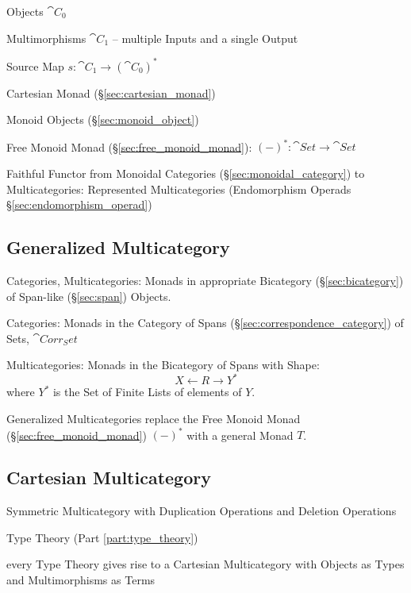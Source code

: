 Objects $\cat{C}_0$

Multimorphisms $\cat{C}_1$ -- multiple Inputs and a single Output

Source Map $s : \cat{C}_1 \rightarrow (\cat{C}_0)^*$

Cartesian Monad (\S\ref{sec:cartesian_monad})

Monoid Objects (\S\ref{sec:monoid_object})

Free Monoid Monad (\S\ref{sec:free_monoid_monad}): $(-)^* : \cat{Set}
\rightarrow \cat{Set}$

Faithful Functor from Monoidal Categories
(\S\ref{sec:monoidal_category}) to Multicategories: Represented
Multicategories (Endomorphism Operads \S\ref{sec:endomorphism_operad})



\subsection{Generalized Multicategory}
\label{sec:generalized_multicategory}

Categories, Multicategories: Monads in appropriate Bicategory
(\S\ref{sec:bicategory}) of Span-like (\S\ref{sec:span}) Objects.

Categories: Monads in the Category of Spans
(\S\ref{sec:correspondence_category}) of Sets, $\cat{Corr_Set}$

Multicategories: Monads in the Bicategory of Spans with Shape:
\[
  X \leftarrow R \rightarrow Y^*
\]
where $Y^*$ is the Set of Finite Lists of elements of $Y$.

Generalized Multicategories replace the Free Monoid Monad
(\S\ref{sec:free_monoid_monad}) $(-)^*$ with a general Monad $T$.



\subsection{Cartesian Multicategory}
\label{sec:cartesian_multicategory}

Symmetric Multicategory with Duplication Operations and Deletion
Operations

Type Theory (Part \ref{part:type_theory})

every Type Theory gives rise to a Cartesian Multicategory with Objects
as Types and Multimorphisms as Terms

